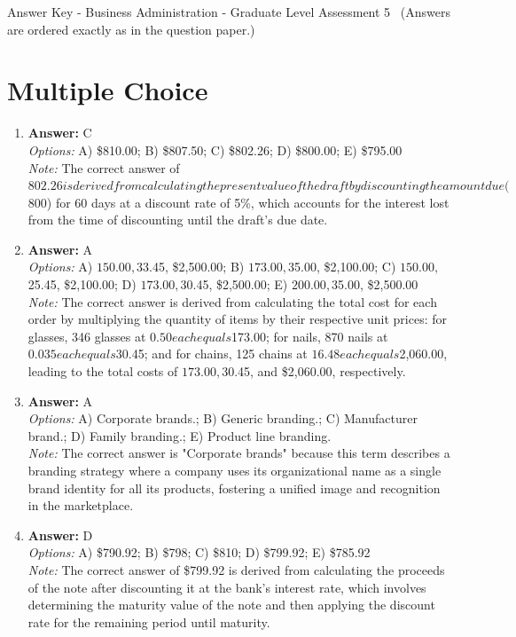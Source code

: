 \documentclass[12pt]{article}
\begin{document}
\begin{center}
Answer Key - Business Administration - Graduate Level Assessment 5 \
\small (Answers are ordered exactly as in the question paper.)
\end{center}

\section*{Multiple Choice}
\begin{enumerate}[label=\arabic*.]
\item \textbf{Answer:} C
\\ \textit{Options:} A) \$810.00; B) \$807.50; C) \$802.26; D) \$800.00; E) \$795.00
\\ \textit{Note:} The correct answer of $802.26 is derived from calculating the present value of the draft by discounting the amount due ($800) for 60 days at a discount rate of 5\%, which accounts for the interest lost from the time of discounting until the draft's due date.
\item \textbf{Answer:} A
\\ \textit{Options:} A) $150.00, $33.45, \$2,500.00; B) $173.00, $35.00, \$2,100.00; C) $150.00, $25.45, \$2,100.00; D) $173.00, $30.45, \$2,500.00; E) $200.00, $35.00, \$2,500.00
\\ \textit{Note:} The correct answer is derived from calculating the total cost for each order by multiplying the quantity of items by their respective unit prices: for glasses, 346 glasses at $0.50 each equals $173.00; for nails, 870 nails at $0.035 each equals $30.45; and for chains, 125 chains at $16.48 each equals $2,060.00, leading to the total costs of $173.00, $30.45, and \$2,060.00, respectively.
\item \textbf{Answer:} A
\\ \textit{Options:} A) Corporate brands.; B) Generic branding.; C) Manufacturer brand.; D) Family branding.; E) Product line branding.
\\ \textit{Note:} The correct answer is "Corporate brands" because this term describes a branding strategy where a company uses its organizational name as a single brand identity for all its products, fostering a unified image and recognition in the marketplace.
\item \textbf{Answer:} D
\\ \textit{Options:} A) \$790.92; B) \$798; C) \$810; D) \$799.92; E) \$785.92
\\ \textit{Note:} The correct answer of \$799.92 is derived from calculating the proceeds of the note after discounting it at the bank's interest rate, which involves determining the maturity value of the note and then applying the discount rate for the remaining period until maturity.

\end{enumerate}
\end{document}
